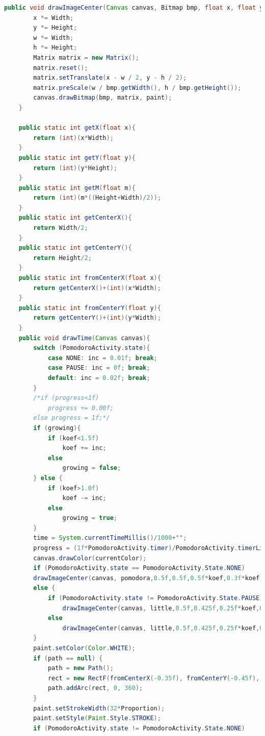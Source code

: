 \documentclass[12pt]{article}
\begin{document}
\begin{lstlisting}[language=java, caption={Fisierul TimeControl.java}, label=list2]
    public void drawImageCenter(Canvas canvas, Bitmap bmp, float x, float y, float w, float h, Paint paint){
        x *= Width;
        y *= Height;
        w *= Width;
        h *= Height;
        Matrix matrix = new Matrix();
        matrix.reset();
        matrix.setTranslate(x - w / 2, y - h / 2);
        matrix.preScale(w / bmp.getWidth(), h / bmp.getHeight());
        canvas.drawBitmap(bmp, matrix, paint);
    }

    public static int getX(float x){
        return (int)(x*Width);
    }
    public static int getY(float y){
        return (int)(y*Height);
    }
    public static int getM(float m){
        return (int)(m*((Height+Width)/2));
    }
    public static int getCenterX(){
        return Width/2;
    }
    public static int getCenterY(){
        return Height/2;
    }
    public static int fromCenterX(float x){
        return getCenterX()+(int)(x*Width);
    }
    public static int fromCenterY(float y){
        return getCenterY()+(int)(y*Width);
    }
    public void drawTime(Canvas canvas){
        switch (PomodoroActivity.state){
            case NONE: inc = 0.01f; break;
            case PAUSE: inc = 0f; break;
            default: inc = 0.02f; break;
        }
        /*if (progress<1f)
            progress += 0.00f;
        else progress = 1f;*/
        if (growing){
            if (koef<1.5f)
                koef += inc;
            else
                growing = false;
        } else {
            if (koef>1.0f)
                koef -= inc;
            else
                growing = true;
        }
        time = System.currentTimeMillis()/1000+"";
        progress = (1f*PomodoroActivity.timer)/PomodoroActivity.timerLimit;
        canvas.drawColor(currentColor);
        if (PomodoroActivity.state == PomodoroActivity.State.NONE)
        drawImageCenter(canvas, pomodora,0.5f,0.5f,0.5f*koef,0.3f*koef,paint);
        else {
            if (PomodoroActivity.state != PomodoroActivity.State.PAUSE)
                drawImageCenter(canvas, little,0.5f,0.425f,0.25f*koef,0.18f*koef,paint);
            else
                drawImageCenter(canvas, little,0.5f,0.425f,0.25f*koef,0.18f*koef,paint);
        }
        paint.setColor(Color.WHITE);
        if (path == null) {
            path = new Path();
            rect = new RectF(fromCenterX(-0.35f), fromCenterY(-0.45f), fromCenterX(0.35f), fromCenterY(0.25f));
            path.addArc(rect, 0, 360);
        }
        paint.setStrokeWidth(32*Proportion);
        paint.setStyle(Paint.Style.STROKE);
        if (PomodoroActivity.state != PomodoroActivity.State.NONE)

\end{lstlisting}
\end{document}
